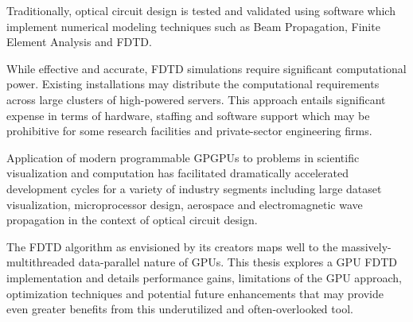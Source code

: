 
Traditionally, optical circuit design is tested and validated using software which implement numerical modeling techniques such as Beam Propagation, Finite Element Analysis and FDTD.

While effective and accurate, FDTD simulations require significant computational power. Existing installations may distribute the computational requirements across large clusters of high-powered servers. This approach entails significant expense in terms of hardware, staffing and software support which may be prohibitive for some research facilities and private-sector engineering firms.

Application of modern programmable GPGPUs to problems in scientific visualization and computation has facilitated dramatically accelerated development cycles for a variety of industry segments including large dataset visualization, microprocessor design, aerospace and electromagnetic wave propagation in the context of optical circuit design.

The FDTD algorithm as envisioned by its creators maps well to the massively-multithreaded data-parallel nature of GPUs. This thesis explores a GPU FDTD implementation and details performance gains, limitations of the GPU approach, optimization techniques and potential future enhancements that may provide even greater benefits from this underutilized and often-overlooked tool. 